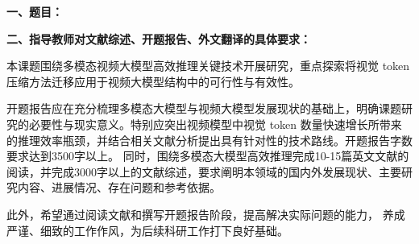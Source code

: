 {
    \setlength{\parindent}{0em}
    \par {\bfseries 一、题目：\Title}
    \\
    \par {\bfseries 二、指导教师对文献综述、开题报告、外文翻译的具体要求：}
}

本课题围绕多模态视频大模型高效推理关键技术开展研究，重点探索将视觉 token 压缩方法迁移应用于视频大模型结构中的可行性与有效性。

开题报告应在充分梳理多模态大模型与视频大模型发展现状的基础上，明确课题研究的必要性与现实意义。特别应突出视频模型中视觉 token 数量快速增长所带来的推理效率瓶颈，并结合相关文献分析提出具有针对性的技术路线。开题报告字数要求达到3500字以上。
同时，围绕多模态大模型高效推理完成10-15篇英文文献的阅读，并完成3000字以上的文献综述，要求阐明本领域的国内外发展现状、主要研究内容、进展情况、存在问题和参考依据。

此外，希望通过阅读文献和撰写开题报告阶段，提高解决实际问题的能力， 养成严谨、细致的工作作风，为后续科研工作打下良好基础。

\mbox{} \vfill

\signature{指导教师（签名）}
